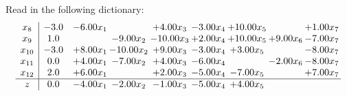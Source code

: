 \documentclass[9pt]{article}
\begin{document}
Read in the following dictionary:
\[\begin{array}{c| c c@{\hskip 2pt} c@{\hskip 2pt} c@{\hskip 2pt} c@{\hskip 2pt} c@{\hskip 2pt} c@{\hskip 2pt} c@{\hskip 2pt} }
 x_{8}   &  -3.0 & -6.00 x_{1} &   & +  4.00 x_{3} & -3.00 x_{4} & + 10.00 x_{5} &   & +  1.00 x_{7}\\
 x_{9}   &  1.0  &   & -9.00 x_{2} & -10.00 x_{3} & +  2.00 x_{4} & + 10.00 x_{5} & +  9.00 x_{6} & -7.00 x_{7}\\
 x_{10}   &  -3.0 & +  8.00 x_{1} & -10.00 x_{2} & +  9.00 x_{3} & -3.00 x_{4} & +  3.00 x_{5} &   & -8.00 x_{7}\\
 x_{11}   &  0.0 & +  4.00 x_{1} & -7.00 x_{2} & +  4.00 x_{3} & -6.00 x_{4} &   & -2.00 x_{6} & -8.00 x_{7}\\
 x_{12}   &  2.0 & +  6.00 x_{1} &   & +  2.00 x_{3} & -5.00 x_{4} & -7.00 x_{5} &   & +  7.00 x_{7}\\
\hline
z    &  0.0 & -4.00 x_{1} & -2.00 x_{2} & -1.00 x_{3} & -5.00 x_{4} & +  4.00 x_{5} &    &   \\
\end{array}\]
\end{document}
